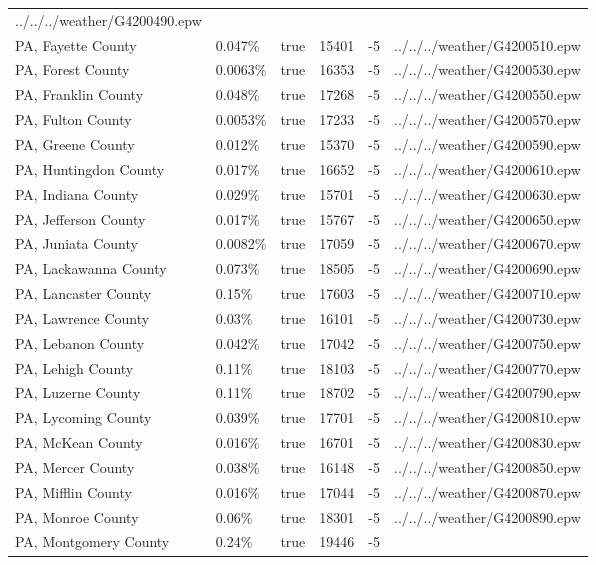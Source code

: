 \begin{longtable}[]{@{}llllll@{}}
../../../weather/G4200490.epw \\
PA, Fayette County & 0.047\% & true & 15401 & -5 &
../../../weather/G4200510.epw \\
PA, Forest County & 0.0063\% & true & 16353 & -5 &
../../../weather/G4200530.epw \\
PA, Franklin County & 0.048\% & true & 17268 & -5 &
../../../weather/G4200550.epw \\
PA, Fulton County & 0.0053\% & true & 17233 & -5 &
../../../weather/G4200570.epw \\
PA, Greene County & 0.012\% & true & 15370 & -5 &
../../../weather/G4200590.epw \\
PA, Huntingdon County & 0.017\% & true & 16652 & -5 &
../../../weather/G4200610.epw \\
PA, Indiana County & 0.029\% & true & 15701 & -5 &
../../../weather/G4200630.epw \\
PA, Jefferson County & 0.017\% & true & 15767 & -5 &
../../../weather/G4200650.epw \\
PA, Juniata County & 0.0082\% & true & 17059 & -5 &
../../../weather/G4200670.epw \\
PA, Lackawanna County & 0.073\% & true & 18505 & -5 &
../../../weather/G4200690.epw \\
PA, Lancaster County & 0.15\% & true & 17603 & -5 &
../../../weather/G4200710.epw \\
PA, Lawrence County & 0.03\% & true & 16101 & -5 &
../../../weather/G4200730.epw \\
PA, Lebanon County & 0.042\% & true & 17042 & -5 &
../../../weather/G4200750.epw \\
PA, Lehigh County & 0.11\% & true & 18103 & -5 &
../../../weather/G4200770.epw \\
PA, Luzerne County & 0.11\% & true & 18702 & -5 &
../../../weather/G4200790.epw \\
PA, Lycoming County & 0.039\% & true & 17701 & -5 &
../../../weather/G4200810.epw \\
PA, McKean County & 0.016\% & true & 16701 & -5 &
../../../weather/G4200830.epw \\
PA, Mercer County & 0.038\% & true & 16148 & -5 &
../../../weather/G4200850.epw \\
PA, Mifflin County & 0.016\% & true & 17044 & -5 &
../../../weather/G4200870.epw \\
PA, Monroe County & 0.06\% & true & 18301 & -5 &
../../../weather/G4200890.epw \\
PA, Montgomery County & 0.24\% & true & 19446 & -5 &

\end{longtable}
